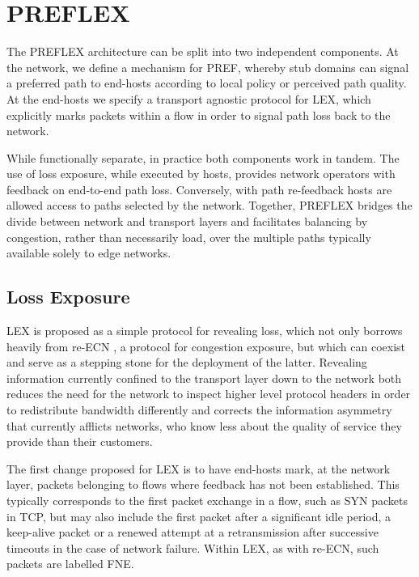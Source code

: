 \section{PREFLEX}

The \ac{PREFLEX} architecture can be split into two independent components. At the network, we define a mechanism for \ac{PREF}, whereby stub domains can signal a preferred path to end-hosts according to local policy or perceived path quality. At the end-hosts we specify a transport agnostic protocol for \ac{LEX}, which explicitly marks packets within a flow in order to signal path loss back to the network.

While functionally separate, in practice both components work in tandem. The use of loss exposure, while executed by hosts, provides network operators with feedback on end-to-end path loss. Conversely, with path re-feedback hosts are allowed access to paths selected by the network. Together, \ac{PREFLEX} bridges the divide between network and transport layers and facilitates balancing by congestion, rather than necessarily load, over the multiple paths typically available solely to edge networks.

\subsection{Loss Exposure}

\ac{LEX} is proposed as a simple protocol for revealing loss, which not only borrows heavily from re-\ac{ECN} \cite{Briscoe:2008p494}, a protocol for congestion exposure, but which can coexist and serve as a stepping stone for the deployment of the latter. Revealing information currently confined to the transport layer down to the network both reduces the need for the network to inspect higher level protocol headers in order to redistribute bandwidth differently and corrects the information asymmetry that currently afflicts networks, who know less about the quality of service they provide than their customers.

The first change proposed for \ac{LEX} is to have end-hosts mark, at the network layer, packets belonging to flows where feedback has not been established. 
This typically corresponds to the first packet exchange in a flow, such as SYN packets in \ac{TCP}, but may also include the first packet after a significant idle period, a keep-alive packet or a renewed attempt at a retransmission after successive timeouts in the case of network failure. 
Within \ac{LEX}, as with re-\ac{ECN}, such packets are labelled \ac{FNE}.

